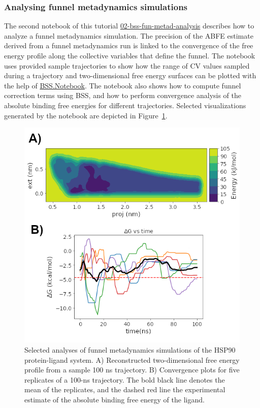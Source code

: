 \hypertarget{analysis}{%
\subsubsection{Analysing funnel metadynamics simulations}\label{analysis}}

The second notebook of this tutorial  \href{https://github.com/OpenBioSim/biosimspace_tutorials/blob/main/02_funnel_metad/02_bss-fun-metad-analysis.ipynb}{02-bss-fun-metad-analysis} describes how to analyze a funnel metadynamics simulation. The precision of the ABFE estimate derived from a funnel metadynamics run is linked to the convergence of the free energy profile along the collective variables that define the funnel. The notebook uses provided sample trajectories to show how the range of CV values sampled during a trajectory and two-dimensional free energy surfaces can be plotted with the help of \href{https://biosimspace.openbiosim.org/api/index_Notebook.html}{BSS.Notebook}. The notebook also shows how to compute funnel correction terms using BSS, and how to perform convergence analysis of the absolute binding free energies for different trajectories. Selected visualizations generated by the notebook are depicted in Figure~\ref{fig:fun-hsp90-analyses}. 

\begin{figure}[htp]
\includegraphics[width=\linewidth]{LIVECOMS/02_funnel_metad/fun-hsp90-analyses.png}
\caption{Selected analyses of funnel metadynamics simulations of the HSP90 protein-ligand system. A) Reconstructed two-dimensional free energy profile from a sample 100 ns trajectory. B) Convergence plots for five replicates of a 100-ns trajectory. The bold black line denotes the mean of the replicates, and the dashed red line the experimental estimate of the absolute binding free energy of the ligand.}
\label{fig:fun-hsp90-analyses}
\end{figure}

